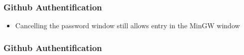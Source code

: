 \documentclass[12pt,english]{beamer}
\begin{document}
\begin{frame}
\frametitle{Github Authentification}

\begin{itemize}
	\item Cancelling the password window still allows entry in the MinGW window
\end{itemize}


\end{frame}

\begin{frame}
\frametitle{Github Authentification}


\end{frame}
\end{document}
